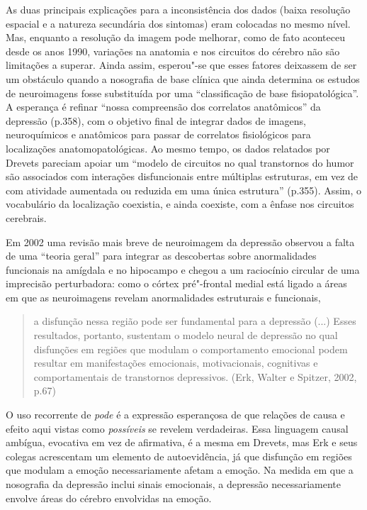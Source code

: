 As duas principais explicações para a inconsistência dos dados (baixa
resolução espacial e a natureza secundária dos sintomas) eram colocadas
no mesmo nível. Mas, enquanto a resolução da imagem pode melhorar, como
de fato aconteceu desde os anos 1990, variações na anatomia e nos
circuitos do cérebro não são limitações a superar. Ainda assim,
esperou"-se que esses fatores deixassem de ser um obstáculo quando a
nosografia de base clínica que ainda determina os estudos de
neuroimagens fosse substituída por uma ``classificação de base
fisiopatológica''. A esperança é refinar ``nossa compreensão dos
correlatos anatômicos'' da depressão (p.358), com o objetivo final de
integrar dados de imagens, neuroquímicos e anatômicos para passar de
correlatos fisiológicos para localizações anatomopatológicas. Ao mesmo
tempo, os dados relatados por Drevets pareciam apoiar um ``modelo de
circuitos no qual transtornos do humor são associados com interações
disfuncionais entre múltiplas estruturas, em vez de com atividade
aumentada ou reduzida em uma única estrutura'' (p.355). Assim, o
vocabulário da localização coexistia, e ainda coexiste, com a ênfase nos
circuitos cerebrais.

Em 2002 uma revisão mais breve de neuroimagem da depressão observou a
falta de uma ``teoria geral'' para integrar as descobertas sobre
anormalidades funcionais na amígdala e no hipocampo e chegou a um
raciocínio circular de uma imprecisão perturbadora: como o córtex
pré"-frontal medial está ligado a áreas em que as neuroimagens revelam
anormalidades estruturais e funcionais,

\begin{quote}
a disfunção nessa região pode ser fundamental para a depressão (...)
Esses resultados, portanto, sustentam o modelo neural de depressão no
qual disfunções em regiões que modulam o comportamento emocional podem
resultar em manifestações emocionais, motivacionais, cognitivas e
comportamentais de transtornos depressivos. (Erk, Walter e Spitzer,
2002, p.67)
\end{quote}

O uso recorrente de \emph{pode} é a expressão esperançosa de que
relações de causa e efeito aqui vistas como \emph{possíveis} se revelem
verdadeiras. Essa linguagem causal ambígua, evocativa em vez de
afirmativa, é a mesma em Drevets, mas Erk e seus colegas acrescentam um
elemento de autoevidência, já que disfunção em regiões que modulam a
emoção necessariamente afetam a emoção. Na medida em que a nosografia da
depressão inclui sinais emocionais, a depressão necessariamente envolve
áreas do cérebro envolvidas na emoção.

